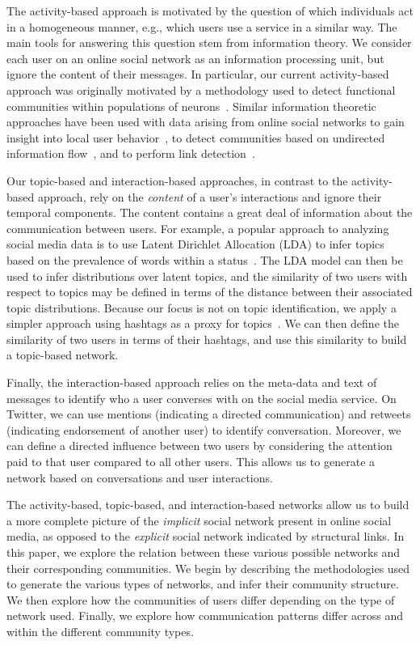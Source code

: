 The activity-based approach is motivated by the question of which individuals act in a homogeneous manner, e.g., which users use a service in a similar way. The main tools for answering this question stem from information theory. We consider each user on an online social network as an information processing unit, but ignore the content of their messages. 
In particular, our current activity-based approach was originally motivated by a methodology used to detect functional communities within populations of neurons~\cite{shalizi2007discovering}. Similar information theoretic approaches have been used with data arising from online social networks to gain insight into local user behavior~\cite{darmon2013understanding}, to detect communities based on undirected information flow~\cite{darmon2013detecting}, and to perform link detection~\cite{ver2012information}.

Our topic-based and interaction-based approaches, in contrast to the activity-based approach, rely on the \emph{content} of a user's interactions and ignore their temporal components. The content contains a great deal of information about the communication between users. For example, a popular approach to analyzing social media data is to use Latent Dirichlet Allocation (LDA) to infer topics based on the prevalence of words within a status~\cite{zhao2011comparing,michelson2010discovering}. The LDA model can then be used to infer distributions over latent topics, and the similarity of two users with respect to topics may be defined in terms of the distance between their associated topic distributions. Because our focus is not on topic identification, we apply a simpler approach using hashtags as a proxy for topics~\cite{becker2011beyond,tsur2012s}. We can then define the similarity of two users in terms of their hashtags, and use this similarity to build a topic-based network.

Finally, the interaction-based approach relies on the meta-data and text of messages to identify who a user converses with on the social media service. On Twitter, we can use mentions (indicating a directed communication) and retweets (indicating endorsement of another user) to identify conversation. Moreover, we can define a directed influence between two users by considering the attention paid to that user compared to all other users. This allows us to generate a network based on conversations and user interactions.

The activity-based, topic-based, and interaction-based networks allow us to build a more complete picture of the \emph{implicit} social network present in online social media, as opposed to the \emph{explicit} social network indicated by structural links. In this paper, we explore the relation between these various possible networks and their corresponding communities. We begin by describing the methodologies used to generate the various types of networks, and infer their community structure. We then explore how the communities of users differ depending on the type of network used. Finally, we explore how communication patterns differ across and within the different community types.

